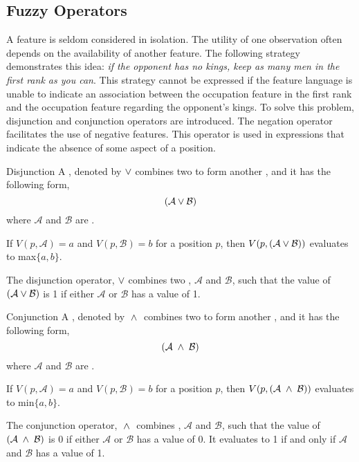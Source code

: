 \subsection{Fuzzy Operators}
\label{sec:language:operator}
A feature is seldom considered in isolation.  The utility of one observation often depends on the availability of another  feature.  The following strategy demonstrates this idea: {\sl if the opponent has no kings, keep as many men in the first rank as you can}.  This strategy cannot be expressed if the feature language is unable to  indicate an association between the occupation feature in the first rank and the occupation feature regarding the opponent's kings.  To solve this problem, disjunction and conjunction operators are introduced.  The negation operator facilitates the use of negative features.  This operator is used in expressions that indicate the absence of some aspect of a position.

\begin{definition} {Disjunction}
A , denoted by $\vee$ combines two \mywffs{} to form another \mywff, and it has the following form,
\[
( \mathcal{A} \vee \mathcal{B} )
\]
where $\mathcal{A}$ and $\mathcal{B}$ are \mywffs{}.

If $V(p,\mathcal{A}) = a$  and $V(p,\mathcal{B}) = b$ for a position $p$, then $V(p,(\mathcal{A} \vee \mathcal{B}))$ evaluates to max$\{a,b\}$.
\end{definition}
The disjunction operator, $\vee$ combines two \mywffs{}, $\mathcal{A}$ and $\mathcal{B}$, such that the value of $( \mathcal{A} \vee \mathcal{B} )$ is 1 if either $\mathcal{A}$ or $\mathcal{B}$ has a value of 1.

\begin{definition} {Conjunction}
A , denoted by $\;\wedge\;$ combines two \mywffs{} to form another \mywff, and it has the following form,
\[( \mathcal{A} \;\wedge\; \mathcal{B} )\]
where $\mathcal{A}$ and $\mathcal{B}$ are \mywffs.

If $V(p,\mathcal{A}) = a$ and $V(p,\mathcal{B}) = b$ for a position $p$, then $V(p,(\mathcal{A} \;\wedge\; \mathcal{B}))$ evaluates to min$\{a,b\}$.
\end{definition}
The conjunction operator, $\;\wedge\;$ combines \mywffs, $\mathcal{A}$ and $\mathcal{B}$, such that the value of $( \mathcal{A} \;\wedge\; \mathcal{B} )$ is 0 if either $\mathcal{A}$ or $\mathcal{B}$ has a value of 0.  It evaluates to 1 if and only if $\mathcal{A}$ and $\mathcal{B}$ has a value of 1.

